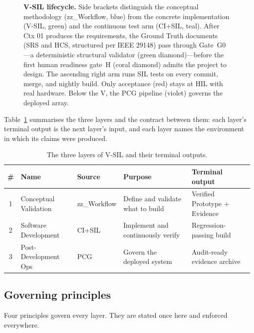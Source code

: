\documentclass[11pt,a4paper]{article}
\begin{document}
\begin{figure}[htbp]
{\begin{tikzpicture}
\end{tikzpicture}}%
\caption{\textbf{V-SIL lifecycle.} Side brackets distinguish the conceptual methodology
(zz\_Workflow, blue) from the concrete implementation (V-SIL, green) and the continuous test
arm (CI+SIL, teal). After Ctx 01 produces the requirements, the Ground Truth documents (SRS
and HCS, structured per IEEE 29148) pass through Gate~G0---a deterministic structural
validator (green diamond)---before the first human readiness gate~H (coral diamond) admits
the project to design. The ascending right arm runs SIL tests on every commit, merge, and
nightly build. Only acceptance (red) stays at HIL with real hardware. Below the V, the PCG
pipeline (violet) governs the deployed array.}
\label{fig:vsil}
\end{figure}

Table~\ref{tab:layers} summarises the three layers and the contract between them: each layer's
terminal output is the next layer's input, and each layer names the environment in which its
claims were produced.

\begin{table}[htbp]
\centering
\caption{The three layers of V-SIL and their terminal outputs.}
\label{tab:layers}
\small
\begin{tabular}{@{}clllp{4.2cm}@{}}
\toprule
\textbf{\#} & \textbf{Name} & \textbf{Source} & \textbf{Purpose} & \textbf{Terminal output} \\
\midrule
1 & Conceptual Validation & zz\_Workflow & Define and validate what to build & Verified Prototype + Evidence \\
2 & Software Development & CI+SIL & Implement and continuously verify & Regression-passing build \\
3 & Post-Development Ops & PCG & Govern the deployed system & Audit-ready evidence archive \\
\bottomrule
\end{tabular}
\end{table}

\subsection{Governing principles}
\label{sec:principles}

Four principles govern every layer. They are stated once here and enforced everywhere.
\end{document}
